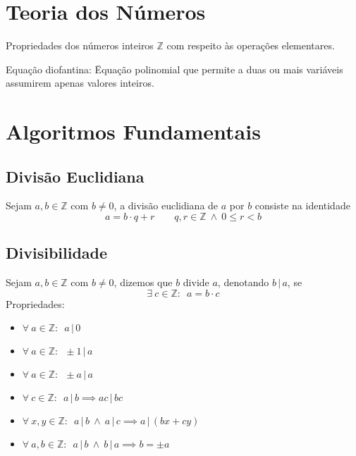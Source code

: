 \documentclass{article}
\begin{document}
\section{Teoria dos Números}
Propriedades dos números inteiros $\mathbb{Z}$ com respeito às operações elementares.
\begin{tabbing}
  Equação diofantina: \= Equação polinomial que permite a duas ou mais variáveis \\
  \> assumirem apenas valores inteiros.
\end{tabbing}



\section{Algoritmos Fundamentais}

\subsection{Divisão Euclidiana}
Sejam $a, b \in \mathbb{Z}$ com $b \neq 0$, a divisão euclidiana de $a$ por $b$ consiste na identidade
\[ a = b \cdot q + r \qquad q, r \in \mathbb{Z} \> \land \> 0 \leq r < b \]


\subsection{Divisibilidade}
Sejam $a, b \in \mathbb{Z}$ com $b \neq 0$, dizemos que $b$ divide $a$, denotando $b\,|\,a$, se
\[ \exists \> c \in \mathbb{Z}: \enspace a = b \cdot c \]
Propriedades:
\begin{itemize}
  \item $\forall \> a \in \mathbb{Z}: \enspace a\,|\,0$
  \item $\forall \> a \in \mathbb{Z}: \enspace \pm 1\,|\,a$
  \item $\forall \> a \in \mathbb{Z}: \enspace \pm a\,|\,a$
  \item $\forall \> c \in \mathbb{Z}: \enspace a\,|\,b \implies ac\,|\,bc$
  \item $\forall \> x, y \in \mathbb{Z}: \enspace a\,|\,b \> \land \> a\,|\,c \implies a\,|\,(bx + cy)$
  \item $\forall \> a, b \in \mathbb{Z}: \enspace a\,|\,b \> \land \> b\,|\,a \implies b = \pm a$
\end{itemize}
\end{document}
